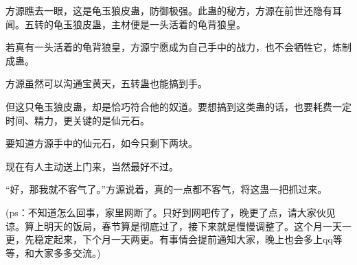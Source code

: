 \begin{this_body}
方源瞧去一眼，这是龟玉狼皮蛊，防御极强。此蛊的秘方，方源在前世还隐有耳闻。五转的龟玉狼皮蛊，主材便是一头活着的龟背狼皇。

若真有一头活着的龟背狼皇，方源宁愿成为自己手中的战力，也不会牺牲它，炼制成蛊。

方源虽然可以沟通宝黄天，五转蛊也能搞到手。

但这只龟玉狼皮蛊，却是恰巧符合他的奴道。要想搞到这类蛊的话，也要耗费一定时间、精力，更关键的是仙元石。

要知道方源手中的仙元石，如今只剩下两块。

现在有人主动送上门来，当然最好不过。

“好，那我就不客气了。”方源说着，真的一点都不客气，将这蛊一把抓过来。

(ps：不知道怎么回事，家里网断了。只好到网吧传了，晚更了点，请大家伙见谅。算上明天的饭局，春节算是彻底过了，接下来就是慢慢调整了。这个月一天一更，先稳定起来，下个月一天两更。有事情会提前通知大家，晚上也会多上qq等等，和大家多多交流。)

\end{this_body}


